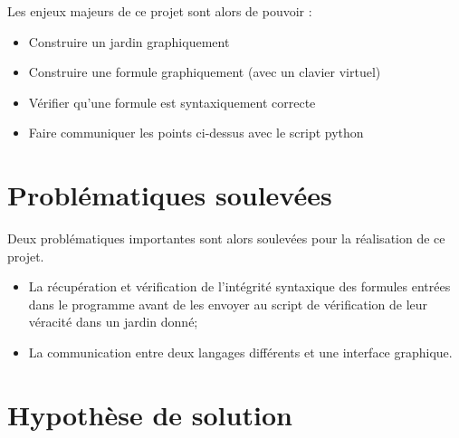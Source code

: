 Les enjeux majeurs de ce projet sont alors de pouvoir :
\begin{itemize}
\item Construire un jardin graphiquement
\item Construire une formule graphiquement (avec un clavier virtuel)
\item Vérifier qu'une formule est syntaxiquement correcte
\item Faire communiquer les points ci-dessus avec le script python
\end{itemize}



\section{Problématiques soulevées}

Deux problématiques importantes sont alors soulevées pour la réalisation de ce projet.
\begin{itemize}
\item La récupération et vérification de l'intégrité syntaxique des formules entrées dans le programme avant de les envoyer au script de vérification de leur véracité dans un jardin donné;
\item La communication entre deux langages différents et une interface graphique.
\end{itemize}

\section{Hypothèse de solution}

